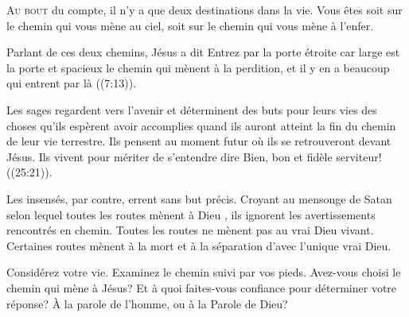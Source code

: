 



\lettrine{A}{u bout} du compte, il n'y a que deux destinations dans la vie.
 Vous êtes soit sur le chemin qui vous mène au ciel,
 soit sur le chemin qui vous mène à l'enfer.

Parlant de ces deux chemins, Jésus a dit\frcolon{} 
 \Og Entrez par la porte étroite car large est la porte et spacieux le chemin
 qui mènent à la perdition,
 et il y en a beaucoup qui entrent par là \Fg{}
 ((7:13)).


Les sages regardent vers l'avenir et déterminent des buts pour leurs vies
 \ocadr des choses qu'ils espèrent avoir accomplies quand ils auront atteint
 la fin du chemin de leur vie terrestre.
 Ils pensent au moment futur où ils se retrouveront devant Jésus.
 Ils vivent pour mériter de s'entendre dire\frcolon{} 
 \Og Bien, bon et fidèle serviteur! \Fg{} ((25:21)).

Les insensés, par contre, errent sans but précis.
 Croyant au mensonge de Satan selon lequel
 \Og toutes les routes mènent à Dieu \Fg{},
 ils ignorent les avertissements rencontrés en chemin.
 Toutes les routes ne mènent pas au vrai Dieu vivant.
 Certaines routes mènent à la mort
 \ocadr et à la séparation d'avec l'unique vrai Dieu.

Considérez votre vie. Examinez le chemin suivi par vos pieds.
 Avez-vous choisi le chemin qui mène à Jésus?
 Et à quoi faites-vous confiance pour déterminer votre réponse?
 À la parole de l'homme, ou à la Parole de Dieu?

\dvrule



